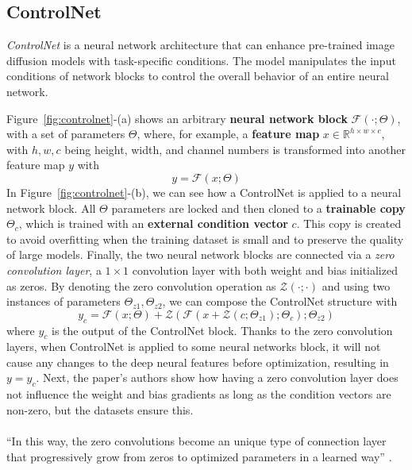 \documentclass[preprint]{elsarticle}
\begin{document}
\subsection{ControlNet}
\emph{ControlNet} \cite{zhang2023adding} is a neural network architecture that can enhance 
pre-trained image diffusion models with task-specific conditions. 
The model manipulates the input conditions of network blocks to control the overall behavior of an entire neural network.


Figure~\ref{fig:controlnet}-(a) shows an arbitrary \textbf{neural network block} $\mathcal{F}(\cdot;\Theta)$, 
with a set of parameters $\Theta$,
where, for example, a \textbf{feature map} $x \in \mathbb{R}^{h\times w \times c}$, with ${h,w,c}$ 
being height, width, and channel numbers
is transformed into another feature map $y$ with
\begin{equation}
	y = \mathcal{F}(x;\Theta)
\end{equation}
In Figure~\ref{fig:controlnet}-(b), we can see how a ControlNet is applied to a neural network block.
All $\Theta$ parameters are locked and then cloned to a \textbf{trainable copy} $\Theta_c$, 
which is trained with an \textbf{external condition vector} $c$. 
This copy is created to avoid overfitting when the training dataset is small 
and to preserve the quality of large models. 
Finally, the two neural network blocks are connected via a \emph{zero convolution layer}, 
a $1\times1$ convolution layer with both weight and bias initialized as zeros.
By denoting the zero convolution operation as $\mathcal{Z}(\cdot;\cdot)$
and using two instances of parameters ${\Theta_{z1},\Theta_{z2}}$,
we can compose the ControlNet structure with
\begin{equation}
	y_c = \mathcal{F}(x;\Theta) + \mathcal{Z}(\mathcal{F}(x+\mathcal{Z}(c;\Theta_{z1});\Theta_c);\Theta_{z2})
\end{equation}
where $y_c$ is the output of the ControlNet block.
Thanks to the zero convolution layers, when ControlNet is applied to some neural networks block, 
it will not cause any changes to the deep neural features before optimization, resulting in $y=y_c$.
Next, the paper's authors show how having a zero convolution layer does not influence the weight 
and bias gradients as long as the condition vectors are non-zero, but the datasets ensure this.\\\\
``In this way, the 
zero convolutions become an unique type of connection layer that progressively grow from zeros to
optimized parameters in a learned way'' \cite{zhang2023adding}.\\
\end{document}
